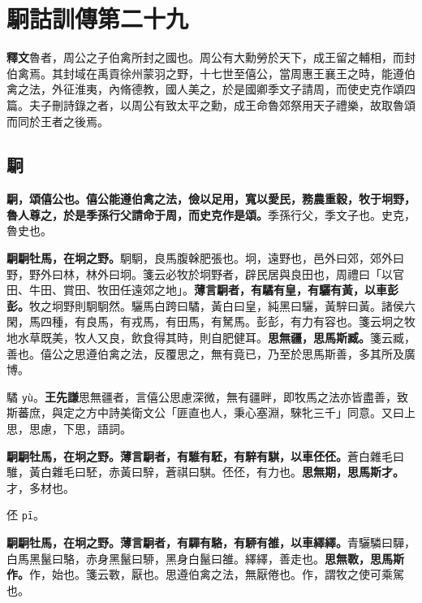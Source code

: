 \chapter{駉詁訓傳第二十九}

\begin{quoting}\textbf{釋文}魯者，周公之子伯禽所封之國也。周公有大勳勞於天下，成王留之輔相，而封伯禽焉。其封域在禹貢徐州蒙羽之野，十七世至僖公，當周惠王襄王之時，能遵伯禽之法，外征淮夷，內脩德教，國人美之，於是國卿季文子請周，而使史克作頌四篇。夫子刪詩錄之者，以周公有致太平之勳，成王命魯郊祭用天子禮樂，故取魯頌而同於王者之後焉。\end{quoting}

\section{駉}


\textbf{駉，頌僖公也。僖公能遵伯禽之法，儉以足用，寬以愛民，務農重穀，牧于坰野，魯人尊之，於是季孫行父請命于周，而史克作是頌。}{\footnotesize 季孫行父，季文子也。史克，魯史也。}

\textbf{駉駉牡馬，在坰之野。}{\footnotesize 駉駉，良馬腹榦肥張也。坰，遠野也，邑外曰郊，郊外曰野，野外曰林，林外曰坰。箋云必牧於坰野者，辟民居與良田也，周禮曰「以官田、牛田、賞田、牧田任遠郊之地」。}\textbf{薄言駉者，有驈有皇，有驪有黃，以車彭彭。}{\footnotesize 牧之坰野則駉駉然。驪馬白跨曰驈，黃白曰皇，純黑曰驪，黃騂曰黃。諸侯六閑，馬四種，有良馬，有戎馬，有田馬，有駑馬。彭彭，有力有容也。箋云坰之牧地水草既美，牧人又良，飲食得其時，則自肥健耳。}\textbf{思無疆，思馬斯臧。}{\footnotesize 箋云臧，善也。僖公之思遵伯禽之法，反覆思之，無有竟已，乃至於思馬斯善，多其所及廣博。}

\begin{quoting}驈 \texttt{yù}。\textbf{王先謙}思無疆者，言僖公思慮深微，無有疆畔，即牧馬之法亦皆盡善，致斯蕃庶，與定之方中詩美衛文公「匪直也人，秉心塞淵，騋牝三千」同意。又曰上思，思慮，下思，語詞。\end{quoting}

\textbf{駉駉牡馬，在坰之野。薄言駉者，有騅有駓，有騂有騏，以車伾伾。}{\footnotesize 蒼白雜毛曰騅，黃白雜毛曰駓，赤黃曰騂，蒼祺曰騏。伾伾，有力也。}\textbf{思無期，思馬斯才。}{\footnotesize 才，多材也。}

\begin{quoting}伾 \texttt{pī}。\end{quoting}

\textbf{駉駉牡馬，在坰之野。薄言駉者，有驒有駱，有駵有雒，以車繹繹。}{\footnotesize 青驪驎曰驒，白馬黑鬣曰駱，赤身黑鬣曰駵，黑身白鬣曰雒。繹繹，善走也。}\textbf{思無斁，思馬斯作。}{\footnotesize 作，始也。箋云斁，厭也。思遵伯禽之法，無厭倦也。作，謂牧之使可乘駕也。}

